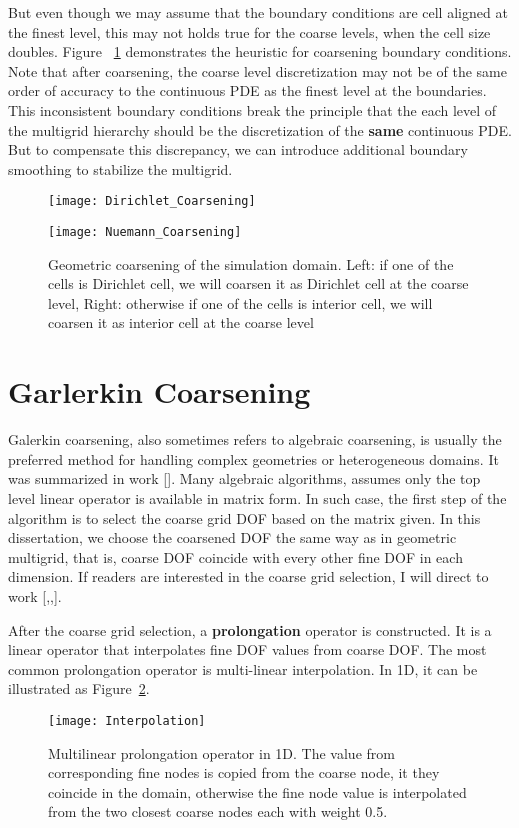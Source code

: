 But even though we may assume that the boundary conditions are cell aligned at the finest level, this may not holds true for the coarse levels, when the cell size doubles. Figure ~\ref{fig:GeometricCoarsening} demonstrates the heuristic for coarsening boundary conditions. Note that after coarsening, the coarse level discretization may not be of the same order of accuracy to the continuous PDE as the finest level at the boundaries. This inconsistent boundary conditions break the principle that the each level of the multigrid hierarchy should be the discretization of the \textbf{same} continuous PDE. But to compensate this discrepancy, we can introduce additional boundary smoothing to stabilize the multigrid.
\begin{figure}[t]
\centering
\begin{minipage}{.5\textwidth}
  \centering
  \texttt{[image: Dirichlet\_Coarsening]}
\end{minipage}%
\begin{minipage}{.5\textwidth}
  \centering
  \texttt{[image: Nuemann\_Coarsening]}
\end{minipage}
  \caption{Geometric coarsening of the simulation domain. Left: if one of the cells is Dirichlet cell, we will coarsen it as Dirichlet cell at the coarse level, Right: otherwise if one of the cells is interior cell, we will coarsen it as interior cell at the coarse level}
  \label{fig:GeometricCoarsening}
\end{figure}
\section{Garlerkin Coarsening}
Galerkin coarsening, also sometimes refers to algebraic coarsening, is usually the preferred method for handling complex geometries or heterogeneous domains. It was summarized in work [\cite{brandt1986algebraic}]. Many algebraic algorithms, assumes only the top level linear operator is available in matrix form. In such case, the first step of the algorithm is to select the coarse grid DOF based on the matrix given. In this dissertation, we choose the coarsened DOF the same way as in geometric multigrid, that is, coarse DOF coincide with every other fine DOF in each dimension. If readers are interested in the coarse grid selection, I will direct to work [\cite{vanvek1996algebraic},\cite{brandt1986algebraic},\cite{griebel2003algebraic}].

After the coarse grid selection, a \textbf{prolongation} operator is constructed. It is a linear operator that interpolates fine DOF values from coarse DOF. The most common prolongation operator is multi-linear interpolation. In 1D, it can be illustrated as Figure~\ref{fig:MultilinearInterpolation}.
\begin{figure}[t]
\centering
\texttt{[image: Interpolation]}
  \caption{Multilinear prolongation operator in 1D. The value from corresponding fine nodes is copied from the coarse node, it they coincide in the domain, otherwise the fine node value is interpolated from the two closest coarse nodes each with weight 0.5.}
  \label{fig:MultilinearInterpolation}
\end{figure}

